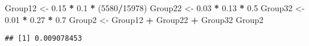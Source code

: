 \documentclass[]{article}
\newenvironment{Shaded}{\begin{snugshade}}{\end{snugshade}}
\newcommand{\DecValTok}[1]{\textcolor[rgb]{0.00,0.00,0.81}{#1}}
\newcommand{\FloatTok}[1]{\textcolor[rgb]{0.00,0.00,0.81}{#1}}
\newcommand{\KeywordTok}[1]{\textcolor[rgb]{0.13,0.29,0.53}{\textbf{#1}}}
\newcommand{\NormalTok}[1]{#1}
\newcommand{\OperatorTok}[1]{\textcolor[rgb]{0.81,0.36,0.00}{\textbf{#1}}}
\newcommand{\StringTok}[1]{\textcolor[rgb]{0.31,0.60,0.02}{#1}}
\begin{document}
\begin{Shaded}
\begin{Highlighting}[]
\NormalTok{Group12 <-}\StringTok{ }\FloatTok{0.15} \OperatorTok{*}\StringTok{ }\FloatTok{0.1} \OperatorTok{*}\StringTok{ }\NormalTok{(}\DecValTok{5580}\OperatorTok{/}\DecValTok{15978}\NormalTok{)}
\NormalTok{Group22 <-}\StringTok{ }\FloatTok{0.03} \OperatorTok{*}\StringTok{ }\FloatTok{0.13} \OperatorTok{*}\StringTok{ }\FloatTok{0.5}
\NormalTok{Group32 <-}\StringTok{ }\FloatTok{0.01} \OperatorTok{*}\StringTok{ }\FloatTok{0.27} \OperatorTok{*}\StringTok{ }\FloatTok{0.7}
\NormalTok{Group2 <-}\StringTok{ }\NormalTok{Group12 }\OperatorTok{+}\StringTok{ }\NormalTok{Group22 }\OperatorTok{+}\StringTok{ }\NormalTok{Group32}
\NormalTok{Group2}
\end{Highlighting}
\end{Shaded}

\begin{verbatim}
## [1] 0.009078453
\end{verbatim}

\begin{Shaded}
\end{Shaded}
\end{document}
